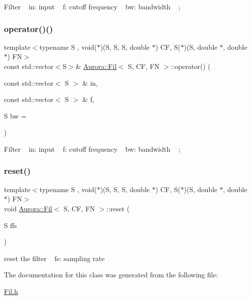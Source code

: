 Filter ~\newline
in\+: input ~\newline
f\+: cutoff frequency ~\newline
bw\+: bandwidth ~\newline
; \mbox{\label{class_aurora_1_1_fil_af5803c67f4b30e46045aa51dfbe13ea9}} 
\subsubsection{\texorpdfstring{operator()()}{operator()()}\hspace{0.1cm}{\footnotesize\ttfamily [2/2]}}
{\footnotesize\ttfamily template$<$typename S , void($\ast$)(\+S, S, S, double $\ast$) CF, S($\ast$)(\+S, double $\ast$, double $\ast$) FN$>$ \\
const std\+::vector$<$S$>$\& \hyperlink{class_aurora_1_1_fil}{Aurora\+::\+Fil}$<$ S, CF, FN $>$\+::operator() (\begin{DoxyParamCaption}\item[{const std\+::vector$<$ S $>$ \&}]{in,  }\item[{const std\+::vector$<$ S $>$ \&}]{f,  }\item[{S}]{bw = {} }\end{DoxyParamCaption})\hspace{0.3cm}{\ttfamily [inline]}}

Filter ~\newline
in\+: input ~\newline
f\+: cutoff frequency ~\newline
bw\+: bandwidth ~\newline
; \mbox{\label{class_aurora_1_1_fil_aff34ac5681c55706eabb15cdbc03379c}} 
\subsubsection{\texorpdfstring{reset()}{reset()}}
{\footnotesize\ttfamily template$<$typename S , void($\ast$)(\+S, S, S, double $\ast$) CF, S($\ast$)(\+S, double $\ast$, double $\ast$) FN$>$ \\
void \hyperlink{class_aurora_1_1_fil}{Aurora\+::\+Fil}$<$ S, CF, FN $>$\+::reset (\begin{DoxyParamCaption}\item[{S}]{ffs }\end{DoxyParamCaption})\hspace{0.3cm}{\ttfamily [inline]}}

reset the filter ~\newline
 fs\+: sampling rate 

The documentation for this class was generated from the following file\+:\begin{DoxyCompactItemize}
\item 
\hyperlink{_fil_8h}{Fil.\+h}\end{DoxyCompactItemize}
